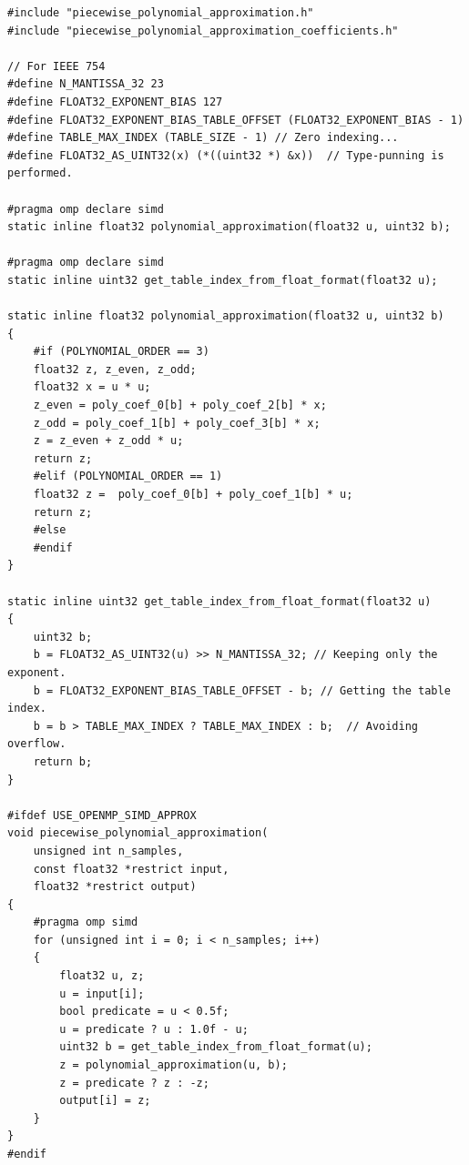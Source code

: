\documentclass[11pt,a4paper,oneside,english]{extarticle}
\begin{document}
\begin{lstfloat}[h!tb]
\begin{lstlisting}[style=C, captionpos=b, caption={Piecewise polynomial approximation implementations using OpenMP.}, label={code:c:piecewise_polynomial_approximation_use_openmp_simd_approx}]
#include "piecewise_polynomial_approximation.h"
#include "piecewise_polynomial_approximation_coefficients.h"

// For IEEE 754
#define N_MANTISSA_32 23
#define FLOAT32_EXPONENT_BIAS 127
#define FLOAT32_EXPONENT_BIAS_TABLE_OFFSET (FLOAT32_EXPONENT_BIAS - 1)
#define TABLE_MAX_INDEX (TABLE_SIZE - 1) // Zero indexing...
#define FLOAT32_AS_UINT32(x) (*((uint32 *) &x))  // Type-punning is performed.

#pragma omp declare simd
static inline float32 polynomial_approximation(float32 u, uint32 b);

#pragma omp declare simd
static inline uint32 get_table_index_from_float_format(float32 u);

static inline float32 polynomial_approximation(float32 u, uint32 b) 
{
    #if (POLYNOMIAL_ORDER == 3)
    float32 z, z_even, z_odd;
    float32 x = u * u;
    z_even = poly_coef_0[b] + poly_coef_2[b] * x;
    z_odd = poly_coef_1[b] + poly_coef_3[b] * x;
    z = z_even + z_odd * u;
    return z;
    #elif (POLYNOMIAL_ORDER == 1)
    float32 z =  poly_coef_0[b] + poly_coef_1[b] * u;
    return z;
    #else
    #endif
}

static inline uint32 get_table_index_from_float_format(float32 u)
{
    uint32 b;
    b = FLOAT32_AS_UINT32(u) >> N_MANTISSA_32; // Keeping only the exponent.
    b = FLOAT32_EXPONENT_BIAS_TABLE_OFFSET - b; // Getting the table index.
    b = b > TABLE_MAX_INDEX ? TABLE_MAX_INDEX : b;  // Avoiding overflow.
    return b;
}

#ifdef USE_OPENMP_SIMD_APPROX
void piecewise_polynomial_approximation(
    unsigned int n_samples,
    const float32 *restrict input, 
    float32 *restrict output)
{
    #pragma omp simd 
    for (unsigned int i = 0; i < n_samples; i++)
    {
        float32 u, z;
        u = input[i];
        bool predicate = u < 0.5f;
        u = predicate ? u : 1.0f - u;
        uint32 b = get_table_index_from_float_format(u);
        z = polynomial_approximation(u, b);
        z = predicate ? z : -z;
        output[i] = z;
    }
}
#endif
\end{lstlisting}
\end{lstfloat}
\end{document}
